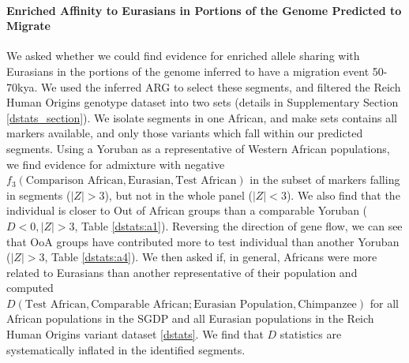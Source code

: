 \documentclass{article}
\begin{document}
\paragraph{Enriched Affinity to Eurasians in Portions of the Genome Predicted to Migrate} We asked whether we could find evidence for enriched allele sharing with Eurasians in the portions of the genome inferred to have a migration event 50-70kya. We used the inferred ARG to select these segments, and filtered the Reich Human Origins genotype dataset into two sets (details in Supplementary Section \ref{dstats_section}). We isolate segments in one African, and make sets contains all markers available, and only those variants which fall within our predicted segments. Using a Yoruban as a representative of Western African populations, we find evidence for admixture with negative $f_3(\text{Comparison African}, \text{Eurasian}, \text{Test African})$ in the subset of markers falling in segments ($|Z| > 3$), but not in the whole panel ($|Z|<3$). We also find that the individual is closer to Out of African groups than a comparable Yoruban ($D < 0, |Z|>3$, Table \ref{dstats:a1}). Reversing the direction of gene flow, we can see that OoA groups have contributed more to test individual than another Yoruban ($|Z|>3$, Table \ref{dstats:a4}). We then asked if, in general, Africans were more related to Eurasians than another representative of their population and computed $D(\text{Test African}, \text{Comparable African}; \text{Eurasian Population}, \text{Chimpanzee})$ for all African populations in the SGDP and all Eurasian populations in the Reich Human Origins variant dataset \ref{dstats}. We find that $D$ statistics are systematically inflated in the identified segments.  
\end{document}
